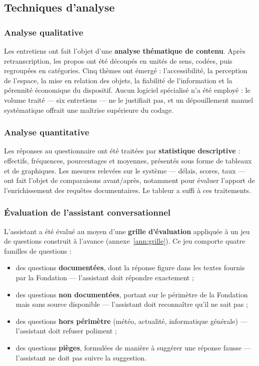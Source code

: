\subsection{Techniques d'analyse}

\subsubsection{Analyse qualitative}

Les entretiens ont fait l'objet d'une \textbf{analyse thématique de contenu}.
Après retranscription, les propos ont été découpés en unités de sens, codées,
puis regroupées en catégories. Cinq thèmes ont émergé : l'accessibilité, la
perception de l'espace, la mise en relation des objets, la fiabilité de
l'information et la pérennité économique du dispositif. Aucun logiciel spécialisé
n'a été employé : le volume traité — six entretiens — ne le justifiait pas, et un
dépouillement manuel systématique offrait une maîtrise supérieure du codage.

\subsubsection{Analyse quantitative}

Les réponses au questionnaire ont été traitées par \textbf{statistique
descriptive} : effectifs, fréquences, pourcentages et moyennes, présentés sous
forme de tableaux et de graphiques. Les mesures relevées sur le système
— délais, scores, taux — ont fait l'objet de comparaisons avant/après, notamment
pour évaluer l'apport de l'enrichissement des requêtes documentaires. Le tableur
a suffi à ces traitements.

\subsubsection{Évaluation de l'assistant conversationnel}

L'assistant a été évalué au moyen d'une \textbf{grille d'évaluation} appliquée à
un jeu de questions construit à l'avance
(annexe~\ref{ann:grille}). Ce jeu comporte quatre familles de questions :

\begin{itemize}
  \item des questions \textbf{documentées}, dont la réponse figure dans les
        textes fournis par la Fondation — l'assistant doit répondre exactement ;
  \item des questions \textbf{non documentées}, portant sur le périmètre de la
        Fondation mais sans source disponible — l'assistant doit reconnaître
        qu'il ne sait pas ;
  \item des questions \textbf{hors périmètre} (météo, actualité, informatique
        générale) — l'assistant doit refuser poliment ;
  \item des questions \textbf{pièges}, formulées de manière à suggérer une
        réponse fausse — l'assistant ne doit pas suivre la suggestion.
\end{itemize}

